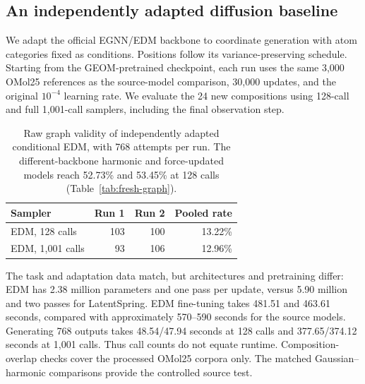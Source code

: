 \subsection{An independently adapted diffusion baseline}\label{sec:edm}
We adapt the official EGNN/EDM backbone \citep{edm} to coordinate generation with atom categories fixed as conditions. Positions follow its variance-preserving schedule. Starting from the GEOM-pretrained checkpoint, each run uses the same 3,000 OMol25 references as the source-model comparison, 30,000 updates, and the original $10^{-4}$ learning rate. We evaluate the 24 new compositions using 128-call and full 1,001-call samplers, including the final observation step.

\begin{table}[t]
\centering
\caption{Raw graph validity of independently adapted conditional EDM, with 768 attempts per run. The different-backbone harmonic and force-updated models reach 52.73\% and 53.45\% at 128 calls (Table~\ref{tab:fresh-graph}).}
\begin{tabular}{lrrr}
\toprule
Sampler & Run 1 & Run 2 & Pooled rate\\
\midrule
EDM, 128 calls &103&100&13.22\%\\
EDM, 1,001 calls &93&106&12.96\%\\
\bottomrule
\end{tabular}\label{tab:edm}
\end{table}

The task and adaptation data match, but architectures and pretraining differ: EDM has 2.38 million parameters and one pass per update, versus 5.90 million and two passes for LatentSpring. EDM fine-tuning takes 481.51 and 463.61 seconds, compared with approximately 570--590 seconds for the source models. Generating 768 outputs takes 48.54/47.94 seconds at 128 calls and 377.65/374.12 seconds at 1,001 calls. Thus call counts do not equate runtime. Composition-overlap checks cover the processed OMol25 corpora only. The matched Gaussian--harmonic comparisons provide the controlled source test.
